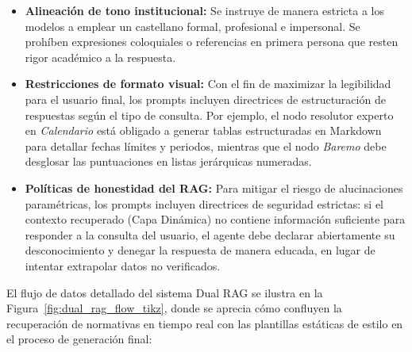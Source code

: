 \documentclass[12pt,a4paper,oneside]{report}
\begin{document}
\begin{itemize}
    \item \textbf{Alineación de tono institucional:} Se instruye de manera estricta a los modelos a emplear un castellano formal, profesional e impersonal. Se prohíben expresiones coloquiales o referencias en primera persona que resten rigor académico a la respuesta.
    \item \textbf{Restricciones de formato visual:} Con el fin de maximizar la legibilidad para el usuario final, los prompts incluyen directrices de estructuración de respuestas según el tipo de consulta. Por ejemplo, el nodo resolutor experto en \textit{Calendario} está obligado a generar tablas estructuradas en Markdown para detallar fechas límites y periodos, mientras que el nodo \textit{Baremo} debe desglosar las puntuaciones en listas jerárquicas numeradas.
    \item \textbf{Políticas de honestidad del RAG:} Para mitigar el riesgo de alucinaciones paramétricas, los prompts incluyen directrices de seguridad estrictas: si el contexto recuperado (Capa Dinámica) no contiene información suficiente para responder a la consulta del usuario, el agente debe declarar abiertamente su desconocimiento y denegar la respuesta de manera educada, en lugar de intentar extrapolar datos no verificados.
\end{itemize}

El flujo de datos detallado del sistema Dual RAG se ilustra en la Figura~\ref{fig:dual_rag_flow_tikz}, donde se aprecia cómo confluyen la recuperación de normativas en tiempo real con las plantillas estáticas de estilo en el proceso de generación final:
\end{document}
